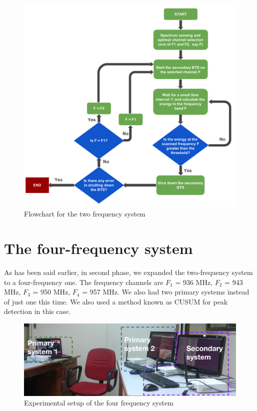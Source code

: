 \begin{figure}
\centering
\includegraphics[width=1\textwidth]{../images/freqSys2}
\caption[Two frequency system]{Flowchart for the two frequency system}
\label{freqSys2}
\end{figure}



\section{The four-frequency system}

As has been said earlier, in second phase, we expanded the two-frequency
system to a four-frequency one. The frequency channels are $F_1$ = 936 MHz, 
$F_2$ = 943 MHz, $F_3$ = 950 MHz, $F_4$ = 957 MHz. We also had two primary 
systems instead of just one this time. We also used a method known as CUSUM 
for peak detection in this case.

\begin{figure}
\centering
\includegraphics[width=1\textwidth]{../images/freq4}
\caption[Experimental setup, 4-frequency system]{Experimental setup of the four
 frequency system}
\label{freq4}
\end{figure}

